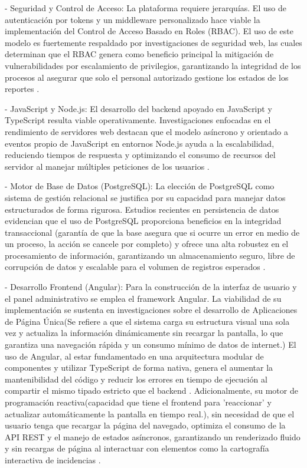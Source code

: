  - Seguridad y Control de Acceso: La plataforma requiere jerarquías. El uso de autenticación por tokens y un middleware personalizado hace viable la implementación del Control de Acceso Basado en Roles (RBAC). El uso de este modelo es fuertemente respaldado por investigaciones de seguridad web, las cuales determinan que el RBAC genera como beneficio principal la mitigación de vulnerabilidades por escalamiento de privilegios, garantizando la integridad de los procesos al asegurar que solo el personal autorizado gestione los estados de los reportes \parencite{garcia2022rbac}.
 
 - JavaScript y Node.js: El desarrollo del backend apoyado en JavaScript y TypeScript resulta  viable operativamente. Investigaciones enfocadas en el rendimiento de servidores web destacan que el modelo asíncrono y orientado a eventos propio de JavaScript en entornos Node.js ayuda a la escalabilidad, reduciendo tiempos de respuesta y optimizando el consumo de recursos del servidor al manejar múltiples peticiones de los usuarios \parencite{torres2023javascript}.
 
 - Motor de Base de Datos (PostgreSQL): La elección de PostgreSQL como sistema de gestión relacional se justifica por su capacidad para manejar datos estructurados de forma rigurosa. Estudios recientes en persistencia de datos evidencian que el uso de PostgreSQL proporciona beneficios en la integridad transaccional (garantía de que la base asegura que si ocurre un error en medio de un proceso, la acción se cancele por completo) y ofrece una alta robustez en el procesamiento de información, garantizando un almacenamiento seguro, libre de corrupción de datos y  escalable para el volumen de registros esperados \parencite{vargas2022postgresql}.
 
 - Desarrollo Frontend (Angular): Para la construcción de la interfaz de usuario  y el panel administrativo se emplea el framework Angular. La viabilidad de su implementación se sustenta en investigaciones sobre el desarrollo de Aplicaciones de Página Única(Se refiere a que el sistema carga su estructura visual una sola vez y actualiza la información dinámicamente sin recargar la pantalla, lo que garantiza una navegación rápida y un consumo mínimo de datos de internet.) El uso de Angular, al estar fundamentado en una arquitectura modular de componentes y utilizar TypeScript de forma nativa, genera el aumentar la mantenibilidad del código y reducir los errores en tiempo de ejecución al compartir el mismo tipado estricto que el backend \parencite{navarro2023angular}. Adicionalmente, su motor de programación reactiva(capacidad que tiene el frontend para 'reaccionar' y actualizar automáticamente la pantalla en tiempo real.), sin necesidad de que el usuario tenga que recargar la página del navegado, optimiza el consumo de la API REST y el manejo de estados asíncronos, garantizando un renderizado fluido y sin recargas de página al interactuar con elementos como la cartografía interactiva de incidencias \parencite{salinas2022reactiva}.

